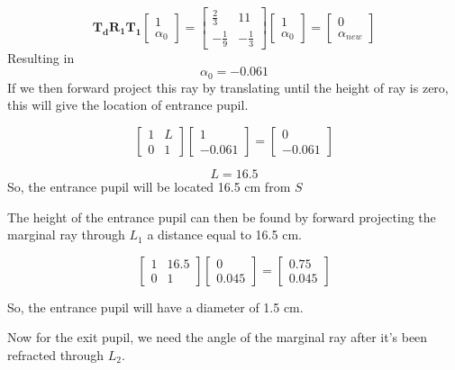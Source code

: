 \documentclass[a4paper]{article}
\begin{document}
$$
\bm{T_d}\bm{R_1}\bm{T_1}
\begin{bmatrix}
    1   \\
    \alpha_{0}
\end{bmatrix}
= 
\begin{bmatrix}
    \frac{2}{3} & 11\\
    - \frac{1}{9} & - \frac{1}{3}
\end{bmatrix}
\begin{bmatrix}
    1   \\
    \alpha_{0}
\end{bmatrix}
=
\begin{bmatrix}
    0   \\
    \alpha_{new}
\end{bmatrix}
$$
Resulting in 
$$ \alpha_{0} = -0.061$$
If we then forward project this ray by translating until the height of ray is zero, this will give the location of entrance pupil.

$$
\begin{bmatrix}
    1 & L\\
    0 & 1
\end{bmatrix}
\begin{bmatrix}
    1   \\
    -0.061
\end{bmatrix}
=
\begin{bmatrix}
    0   \\
    -0.061
\end{bmatrix}
$$

$$ L = 16.5$$
So, the entrance pupil will be located 16.5 cm from $S$

The height of the entrance pupil can then be found by forward projecting the marginal ray through $L_1$ a distance equal to 16.5 cm.

$$ 
\begin{bmatrix}
    1 & 16.5\\
    0 & 1
\end{bmatrix}
\begin{bmatrix}
    0   \\
    0.045
\end{bmatrix}
=
\begin{bmatrix}
    0.75   \\
    0.045
\end{bmatrix}
$$

So, the entrance pupil will have a diameter of 1.5 cm.

Now for the exit pupil, we need the angle of the marginal ray after it's been refracted through $L_2$.
\end{document}

